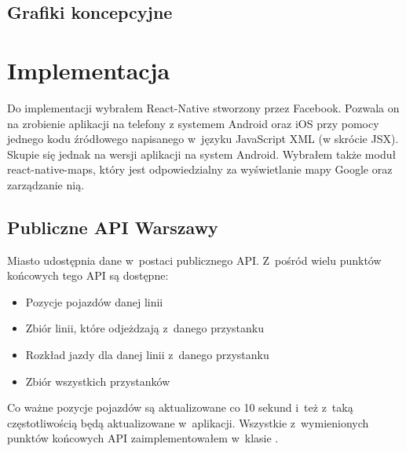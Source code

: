 \documentclass{SGGW-thesis}
\begin{document}
\section{Grafiki koncepcyjne}

\chapter{Implementacja}
Do implementacji wybrałem React-Native stworzony przez Facebook.
Pozwala on na zrobienie aplikacji na telefony z systemem Android oraz iOS przy pomocy jednego kodu źródłowego napisanego w~języku JavaScript XML (w skrócie JSX).
Skupie się jednak na wersji aplikacji na system Android.
Wybrałem także moduł react-native-maps, który jest odpowiedzialny za wyświetlanie mapy Google oraz zarządzanie nią.

\section{Publiczne API Warszawy}
Miasto udostępnia dane w~postaci publicznego API.
Z~pośród wielu punktów końcowych tego API są dostępne:
\begin{itemize}
  \item{Pozycje pojazdów danej linii}
  \item{Zbiór linii, które odjeżdzają z~danego przystanku}
  \item{Rozkład jazdy dla danej linii z~danego przystanku}
  \item{Zbiór wszystkich przystanków}
\end{itemize}
Co ważne pozycje pojazdów są aktualizowane co 10 sekund i~też z~taką częstotliwością będą aktualizowane w~aplikacji.
Wszystkie z~wymienionych punktów końcowych API zaimplementowałem w~klasie .
\end{document}
